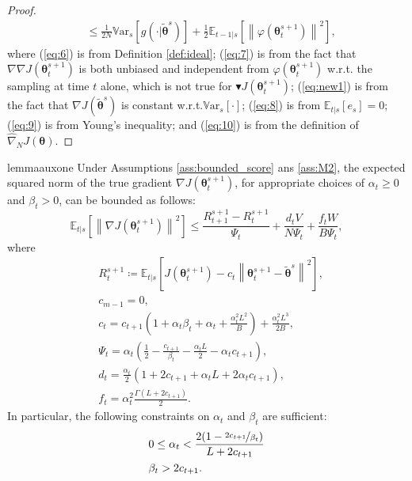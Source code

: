 \documentclass{article}
\makeatletter
\theoremstyle{remark}
\theoremstyle{definition}
\DeclareRobustCommand{\wrt}{w.r.t.\@\xspace}
\newcommand{\norm}[2][\infty]{\left\|#2\right\|_{#1}}
\newcommand{\dnabla}{\nabla\!\!\!\!\nabla}
\newcommand{\vtheta}{\boldsymbol{\theta}}
\newcommand{\gradJ}[1]{\nabla J(#1)}
\newcommand{\gradApp}[2]{\widehat{\nabla}_{#2}J(#1)}
\newcommand{\Ets}[2][t]{\mathbb{E}_{#1\vert s}\left[#2\right]}
\newcommand{\Vars}[1]{{\mathbb{V}\text{ar}}_{s}\left[#1\right]}
\newcommand{\gradBlack}[1]{\blacktriangledown J(#1)}
\newcommand{\gradIdeal}[1]{\dnabla J(#1)}
\makeatother
\begin{document}
\begin{proof}
\begin{align}
	&\leq
	\frac{1}{2N}\Vars{g(\cdot\vert\tilde{\vtheta}^s)} +\frac{1}{2}\Ets[t-1]{\norm[]{\varphi(\vtheta_t^{s+1})}^2},
	\nonumber
\end{align}
where (\ref{eq:6}) is from Definition \ref{def:ideal}; (\ref{eq:7}) is from the fact that $\gradIdeal{\vtheta_t^{s+1}}$ is both unbiased and independent from $\varphi(\vtheta_t^{s+1})$ \wrt the sampling at time $t$ alone, which is not true for $\gradBlack{\vtheta_t^{s+1}}$; 
(\ref{eq:new1}) is from the fact that $\gradJ{\tilde{\vtheta}^s}$ is constant \wrt $\Vars{\cdot}$;
(\ref{eq:8}) is from $\Ets{e_s}=0$; (\ref{eq:9}) is from Young's inequality; and (\ref{eq:10}) is from the definition of $\gradApp{\vtheta}{N}$.
\end{proof}

\begin{restatable}[]{lemma}{auxone}\label{lemma:aux1}
Under Assumptions \ref{ass:bounded_score} ans \ref{ass:M2}, the expected squared norm of the true gradient $\gradJ{\vtheta_t^{s+1}}$, for appropriate choices of $\alpha_t\geq0$ and $\beta_t>0$, can be bounded as follows:
\[
	\Ets{\norm[]{\gradJ{\vtheta_t^{s+1}}}^2} \leq
	\frac{R_{t+1}^{s+1} - R_t^{s+1}}{\Psi_t} + \frac{d_tV}{N\Psi_t}
	+\frac{f_tW}{B\Psi_t},
\]
	where
\begin{align*}
	&R_t^{s+1}\coloneqq \Ets{J(\vtheta_t^{s+1}) - c_t\norm[]{\vtheta_t^{s+1}-\tilde{\vtheta}^s}^2}, \\
	&c_{m-1} = 0, \\
	&c_t = c_{t+1}\left(1+\alpha_t\beta_t+\alpha_t+\frac{\alpha_t^2L^2}{B}\right)+\frac{\alpha_t^2L^3}{2B}, \\
	&\Psi_t = \alpha_t\left(\frac{1}{2}-\frac{c_{t+1}}{\beta_t}-\frac{\alpha_tL}{2}-\alpha_tc_{t+1}\right), \\
	&d_t = \frac{\alpha_t}{2}\left(1+2c_{t+1}+\alpha_tL+2\alpha_tc_{t+1}\right), \\
	&f_t = \alpha_t^2\frac{\Gamma(L+2c_{t+1})}{2}.
\end{align*}
In particular, the following constraints on $\alpha_t$ and $\beta_t$ are sufficient:
\begin{align*}
&0\leq\alpha_t < \frac{2(1-\nicefrac{2c_{t+1}}{\beta_t})}{L+2c_{t+1}} \\
&\beta_t > 2c_{t+1}.
\end{align*}
\end{restatable}
\end{document}
